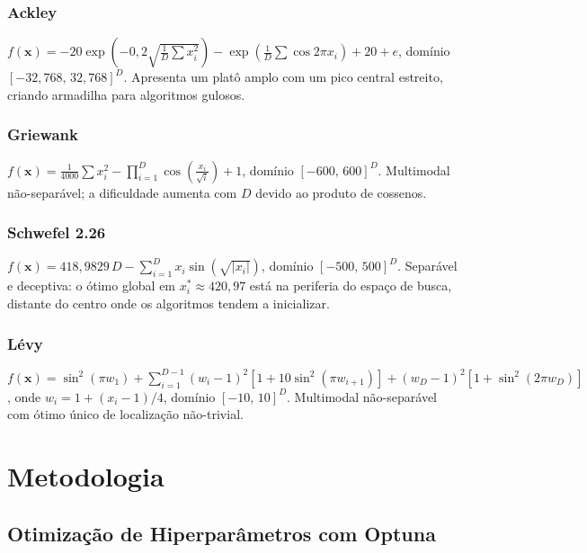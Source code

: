 \documentclass[runningheads]{llncs}
\begin{document}
\subsubsection{Ackley}\leavevmode
$f(\mathbf{x}) = -20\exp\!\left(-0{,}2\sqrt{\frac{1}{D}
\sum x_i^2}\right) - \exp\!\left(\frac{1}{D}\sum\cos 2\pi x_i\right)
+ 20 + e$, domínio $[-32{,}768,\,32{,}768]^D$.
Apresenta um platô amplo com um pico central estreito, criando
armadilha para algoritmos gulosos.

\subsubsection{Griewank}\leavevmode
$f(\mathbf{x}) = \frac{1}{4000}\sum x_i^2 -
\prod_{i=1}^{D}\cos\!\left(\frac{x_i}{\sqrt{i}}\right) + 1$,
domínio $[-600,\,600]^D$.
Multimodal não-separável; a dificuldade aumenta com $D$ devido ao
produto de cossenos.

\subsubsection{Schwefel 2.26}\leavevmode
$f(\mathbf{x}) = 418{,}9829\,D -
\sum_{i=1}^{D} x_i \sin\!\left(\sqrt{|x_i|}\right)$,
domínio $[-500,\,500]^D$.
Separável e deceptiva: o ótimo global em $x_i^* \approx 420{,}97$
está na periferia do espaço de busca, distante do centro onde os
algoritmos tendem a inicializar.


\subsubsection{Lévy}\leavevmode
$f(\mathbf{x}) = \sin^2(\pi w_1) +
\sum_{i=1}^{D-1}(w_i-1)^2\left[1+10\sin^2(\pi w_{i+1})\right]
+ (w_D-1)^2\left[1+\sin^2(2\pi w_D)\right]$,
onde $w_i = 1 + (x_i-1)/4$, domínio $[-10,\,10]^D$.
Multimodal não-separável com ótimo único de localização não-trivial.



\section{Metodologia}
\label{sec:metodologia}

\subsection{Otimiza\c{c}\~{a}o de Hiperpar\^{a}metros com Optuna}
\end{document}
